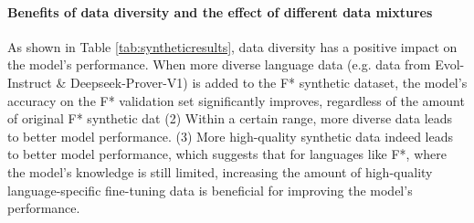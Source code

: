 \paragraph{Benefits of data diversity and the effect of different data mixtures }
As shown in Table \ref{tab:syntheticresults}, data diversity has a positive impact on the model's performance. When more diverse language data (e.g. data from Evol-Instruct \& Deepseek-Prover-V1) is added to the F* synthetic dataset, the model’s accuracy on the F* validation set significantly improves, regardless of the amount of original F* synthetic dat (2) Within a certain range, more diverse data leads to better model performance.  (3)  More high-quality synthetic data indeed leads to better model performance, which suggests that for languages like F*, where the model’s knowledge is still limited, increasing the amount of high-quality language-specific fine-tuning data is beneficial for improving the model’s performance. 




